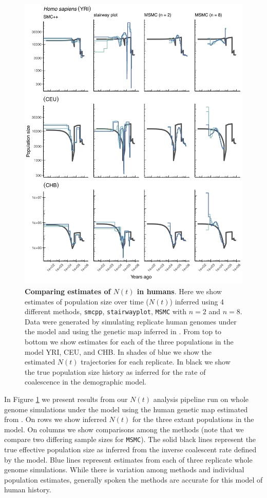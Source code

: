 \documentclass[12pt,halfline,a4paper]{ouparticle}
\newcommand{\MSMC}{\texttt{MSMC}\xspace}
\newcommand{\smcpp}{\texttt{smcpp}\xspace}
\begin{document}
\begin{figure}
\begin{center}
\includegraphics[width=0.8\linewidth]{display_items/homo_sapiens_mask_Ragsdale.png}
\caption{\textbf{Comparing estimates of $N(t)$ in humans}. Here we show estimates of population
size over time ($N(t)$) inferred using 4 different methods, \smcpp, \texttt{stairwayplot},
\MSMC with $n=2$ and $n=8$. Data were generated by simulating
replicate human genomes under the \cite{ragsdale2019models} model and using the genetic map
inferred in \cite{international2007second}. From top to bottom we show estimates for each
of the three populations in the model YRI, CEU, and CHB. In shades of blue we show the estimated
$N(t)$ trajectories for each replicate. In black we show the true population size history as inferred
for the rate of coalescence in the demographic model.}
\label{fig:n_t_ragsdale}
\end{center}
\end{figure}


In Figure \ref{fig:n_t_ragsdale} we present results from our $N(t)$ analysis pipeline
run on whole genome simulations under the \cite{ragsdale2019models} model using the
human genetic map estimated from \cite{international2007second}. On rows
we show inferred $N(t)$ for the three extant populations in the model.
On columns we show comparisons among the methods (note that we compare two differing
sample sizes for \MSMC). The solid black lines represent the true effective population
size as inferred from the inverse coalescent rate defined by the model.
Blue lines represent estimates from each of three replicate whole genome simulations.
While there is variation among methods and individual population estimates,
generally spoken the methods are accurate for this model of human history.
\end{document}
